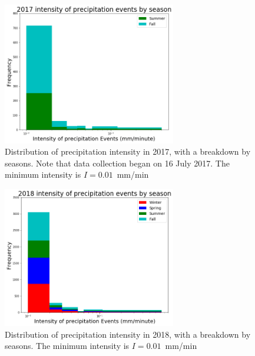 \documentclass[11pt]{report}
\begin{document}
\clearpage
\begin{figure}[t]
  \centering
  \includegraphics[width=0.675\textwidth]{Figures/inten2017.png}
  \caption[Intensity histogram for 2017 broken down by season]
          {\label{i2017}Distribution of precipitation intensity in 2017,
            with a breakdown by seasons. Note that data collection began on
            16 July 2017. The minimum intensity is $I=0.01$~mm/min}
\end{figure}
\begin{figure}[b]
  \centering
  \includegraphics[width=0.675\textwidth]{Figures/inten2018.png}
  \caption[Intensity histogram for 2018 broken down by season]
          {\label{i2018}Distribution of precipitation intensity in 2018,
            with a breakdown by seasons. The minimum intensity is
            $I=0.01$~mm/min}
\end{figure}
\clearpage
\end{document}

